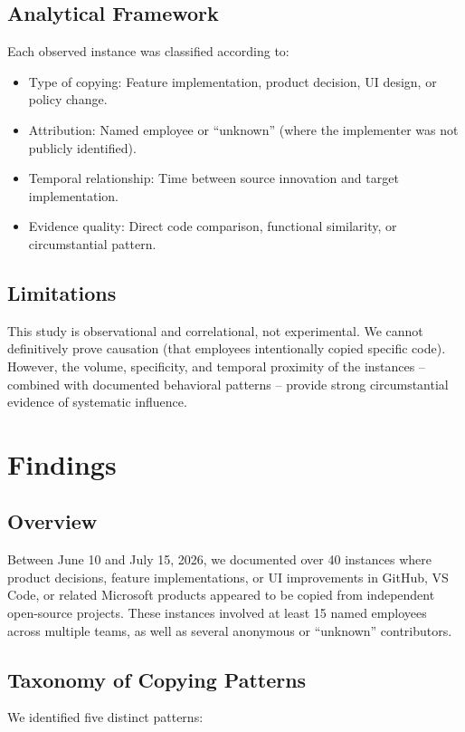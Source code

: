 \documentclass[12pt]{article}
\begin{document}
\subsection{Analytical Framework}
Each observed instance was classified according to:
\begin{itemize}
\item Type of copying: Feature implementation, product decision, UI design, or policy change.
\item Attribution: Named employee or ``unknown'' (where the implementer was not publicly identified).
\item Temporal relationship: Time between source innovation and target implementation.
\item Evidence quality: Direct code comparison, functional similarity, or circumstantial pattern.
\end{itemize}

\subsection{Limitations}
This study is observational and correlational, not experimental. We cannot definitively prove causation (that employees intentionally copied specific code). However, the volume, specificity, and temporal proximity of the instances -- combined with documented behavioral patterns -- provide strong circumstantial evidence of systematic influence.

\section{Findings}

\subsection{Overview}
Between June 10 and July 15, 2026, we documented over 40 instances where product decisions, feature implementations, or UI improvements in GitHub, VS Code, or related Microsoft products appeared to be copied from independent open-source projects. These instances involved at least 15 named employees across multiple teams, as well as several anonymous or ``unknown'' contributors.

\subsection{Taxonomy of Copying Patterns}
We identified five distinct patterns:
\end{document}
